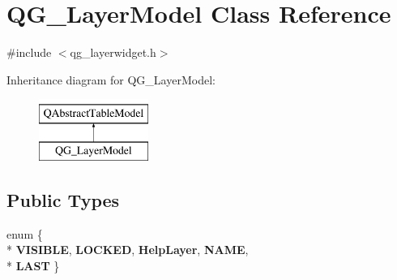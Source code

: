 \hypertarget{classQG__LayerModel}{\section{Q\-G\-\_\-\-Layer\-Model Class Reference}
\label{classQG__LayerModel}
}


{\ttfamily \#include $<$qg\-\_\-layerwidget.\-h$>$}

Inheritance diagram for Q\-G\-\_\-\-Layer\-Model\-:\begin{figure}[H]
\begin{center}
\leavevmode
\includegraphics[height=2.000000cm]{classQG__LayerModel}
\end{center}
\end{figure}
\subsection*{Public Types}
\begin{DoxyCompactItemize}
\item 
enum \{ \\*
{\bfseries V\-I\-S\-I\-B\-L\-E}, 
{\bfseries L\-O\-C\-K\-E\-D}, 
{\bfseries Help\-Layer}, 
{\bfseries N\-A\-M\-E}, 
\\*
{\bfseries L\-A\-S\-T}
 \}
\end{DoxyCompactItemize}
